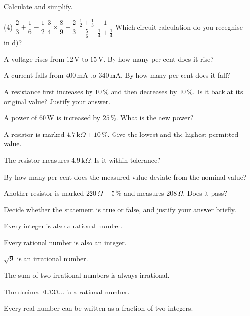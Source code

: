 Calculate and simplify.
\begin{delar}(4)
  \task $\dfrac{2}{3} + \dfrac{1}{6} - \dfrac{1}{2}$
  \task $\dfrac{3}{4} \times \dfrac{8}{9} \div \dfrac{2}{3}$
  \task $\dfrac{\frac{1}{2} + \frac{1}{3}}{\frac{5}{6}}$
  \task $\dfrac{1}{\frac{1}{4} + \frac{1}{4}}$
  \task* Which circuit calculation do you recognise in d)?
\end{delar}

\begin{parts}
  \item A voltage rises from $12\,\text{V}$ to $15\,\text{V}$. By how many per cent does it rise?
  \item A current falls from $400\,\text{mA}$ to $340\,\text{mA}$. By how many per cent does it
    fall?
  \item A resistance first increases by $10\,\%$ and then decreases by $10\,\%$. Is it back at its
    original value? Justify your answer.
  \item A power of $60\,\text{W}$ is increased by $25\,\%$. What is the new power?
\end{parts}

\begin{parts}
  \item A resistor is marked $4.7\,\text{k}\Omega \pm 10\,\%$. Give the lowest and the highest
    permitted value.
  \item The resistor measures $4.9\,\text{k}\Omega$. Is it within tolerance?
  \item By how many per cent does the measured value deviate from the nominal value?
  \item Another resistor is marked $220\,\Omega \pm 5\,\%$ and measures $208\,\Omega$. Does it
    pass?
\end{parts}

Decide whether the statement is true or false, and justify your answer briefly.
\begin{parts}
  \item Every integer is also a rational number.
  \item Every rational number is also an integer.
  \item $\sqrt{9}$ is an irrational number.
  \item The sum of two irrational numbers is always irrational.
  \item The decimal $0.333\ldots$ is a rational number.
  \item Every real number can be written as a fraction of two integers.
\end{parts}

